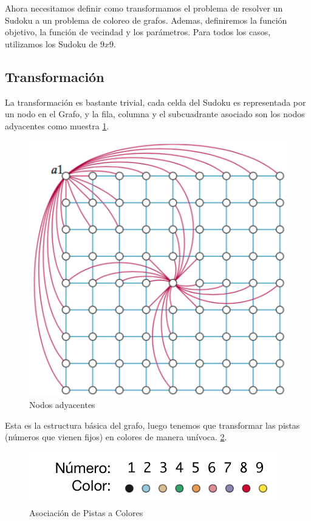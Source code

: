 \documentclass[a4paper,spanish]{article}
\begin{document}
Ahora necesitamos definir como transformamos el problema de resolver un Sudoku
a un problema de coloreo de grafos.
Ademas, definiremos la función objetivo, la función de vecindad y los parámetros.
Para todos los casos, utilizamos los Sudoku de $ 9x9 $.

\subsection{Transformación}
\label{sec:transformacion}

La transformación es bastante trivial, cada celda del Sudoku es representada por
un nodo en el Grafo, y la fila, columna y el subcuadrante asociado son los nodos
adyacentes como muestra \ref{img:adyacentes}.


\begin{figure}[h]
	\centering
	\includegraphics[scale=0.5]{./img/adyacentes.png}
    \caption{Nodos adyacentes}
    \label{img:adyacentes}
\end{figure}

Esta es la estructura básica del grafo, luego tenemos que transformar las pistas
(números que vienen fijos) en colores de manera unívoca. \ref{img:color_map}.

\begin{figure}
	\centering
	\includegraphics[scale=0.5]{./img/numero_color.png}
    \caption{Asociación de Pistas a Colores}
    \label{img:color_map}
\end{figure}
\end{document}
